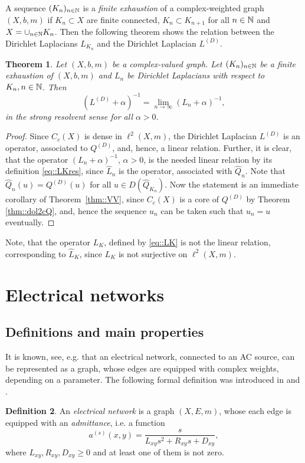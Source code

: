 \documentclass[a4paper,11pt]{amsart}
\newtheorem{theorem}{Theorem}[section]
\theoremstyle{definition}
\newtheorem{definition}[theorem]{Definition}
\renewcommand{\a}{a}%
\newcommand{\cfreq}{s}
\begin{document}
\bigskip
A sequence $(K_n)_{n\in \Bbb N}$ is a {\em finite exhaustion} of a complex-weighted graph $(X,b,m)$ if $K_n\subset X$ are finite connected, $K_n\subset K_{n+1}$ for all $n\in \Bbb N$ and $X=\cup_{n\in \Bbb N}K_n$. Then the following theorem shows the relation between the Dirichlet Laplacians $L_{K_n}$ and the Dirichlet Laplacian $L^{(D)}$.

\begin{theorem}\label{thm::LDeqlimLn}
Let $(X,b,m)$ be a complex-valued graph. Let $(K_n)_{n\in \Bbb N}$  be a finite exhaustion of $(X,b,m)$ and $L_n$ be Dirichlet Laplacians with respect to $K_n, n\in \Bbb N$. Then
\begin{equation*}
(L^{(D)}+\alpha)^{-1}=\lim_{n\to\infty}({L_n}+\alpha)^{-1},
\end{equation*}
in the strong resolvent sense for all $\alpha>0$.
\end{theorem}

\begin{proof}
Since $C_c(X)$ is dense in $\ell^2(X,m)$, the Dirichlet Laplacian $L^{(D)}$  is an operator, associated to $Q^{(D)}$, and, hence, a linear relation. Further, it is clear,
that the operator $(L_n+\alpha)^{-1}$, $\alpha>0$, is the needed  linear relation by its definition \eqref{eq::LKres}, since $\widehat L_n$ is the operator, associated with $\widehat Q_n$. Note that $\widehat Q_n(u)=Q^{(D)}(u)$ for all $u\in D(\widehat Q_{K_n})$. Now the statement is an immediate corollary of Theorem~\ref{thm::VV}, since $C_c(X)$ is a core of $Q^{(D)}$ by Theorem \ref{thm::dol2cQ}, and, hence the sequence $u_n$ can be taken such that $u_n=u$ eventually. 
\end{proof}
Note, that the operator $L_K$, defined by \eqref{eq::LK} is not the linear relation, corresponding to $\widehat L_K$, since $L_K$ is not surjective on $\ell^2(X,m)$.





\section{Electrical networks}
\label{sect::elnetwork}
\subsection{Definitions and main properties}
It is known, see, e.g. \cite{Brune, Feynman, Muranova1} that an electrical network, connected to an AC source, can be represented as a graph, whose  edges are equipped with complex weights, depending on a parameter. The following formal definition was introduced in \cite{Muranova3} and \cite{Muranova1}. 
\begin{definition}\label{def::elnetwork}
An {\em electrical network} is a graph $(X,E,m)$, whose each edge is equipped with an {\em admittance},
i.e. a function
\begin{equation*}
\a^{(\cfreq)}(x,y)=\dfrac{\cfreq}{L_{xy}\cfreq^2 +R_{xy}\cfreq+D_{xy} },
\end{equation*}
where $L_{xy},R_{xy},D_{xy}\ge 0$ and at least one of them is not zero. 
\end{definition}
\end{document}
